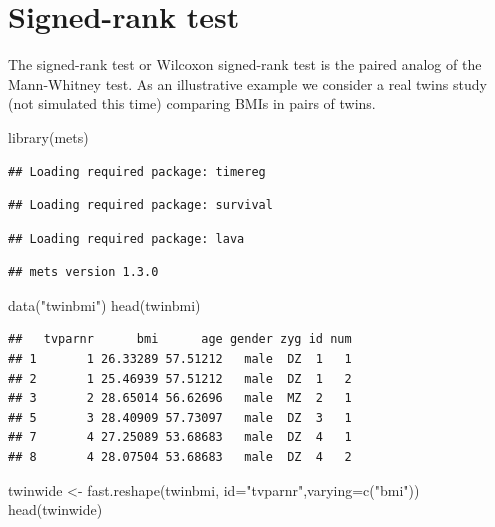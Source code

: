 \documentclass[
]{book}
\newenvironment{Shaded}{\begin{snugshade}}{\end{snugshade}}
\newcommand{\AttributeTok}[1]{\textcolor[rgb]{0.77,0.63,0.00}{#1}}
\newcommand{\FunctionTok}[1]{\textcolor[rgb]{0.00,0.00,0.00}{#1}}
\newcommand{\NormalTok}[1]{#1}
\newcommand{\OtherTok}[1]{\textcolor[rgb]{0.56,0.35,0.01}{#1}}
\newcommand{\StringTok}[1]{\textcolor[rgb]{0.31,0.60,0.02}{#1}}
\begin{document}
\hypertarget{signed-rank-test}{%
\section{Signed-rank test}\label{signed-rank-test}}

The signed-rank test or Wilcoxon signed-rank test is the paired analog of the Mann-Whitney test. As an illustrative example we consider a real twins study (not simulated this time) comparing BMIs in pairs of twins.

\begin{Shaded}
\begin{Highlighting}[]
\FunctionTok{library}\NormalTok{(mets)}
\end{Highlighting}
\end{Shaded}

\begin{verbatim}
## Loading required package: timereg
\end{verbatim}

\begin{verbatim}
## Loading required package: survival
\end{verbatim}

\begin{verbatim}
## Loading required package: lava
\end{verbatim}

\begin{verbatim}
## mets version 1.3.0
\end{verbatim}

\begin{Shaded}
\begin{Highlighting}[]
\FunctionTok{data}\NormalTok{(}\StringTok{"twinbmi"}\NormalTok{)}
\FunctionTok{head}\NormalTok{(twinbmi)}
\end{Highlighting}
\end{Shaded}

\begin{verbatim}
##   tvparnr      bmi      age gender zyg id num
## 1       1 26.33289 57.51212   male  DZ  1   1
## 2       1 25.46939 57.51212   male  DZ  1   2
## 3       2 28.65014 56.62696   male  MZ  2   1
## 5       3 28.40909 57.73097   male  DZ  3   1
## 7       4 27.25089 53.68683   male  DZ  4   1
## 8       4 28.07504 53.68683   male  DZ  4   2
\end{verbatim}

\begin{Shaded}
\begin{Highlighting}[]
\NormalTok{twinwide }\OtherTok{\textless{}{-}} \FunctionTok{fast.reshape}\NormalTok{(twinbmi, }\AttributeTok{id=}\StringTok{"tvparnr"}\NormalTok{,}\AttributeTok{varying=}\FunctionTok{c}\NormalTok{(}\StringTok{"bmi"}\NormalTok{))}
\FunctionTok{head}\NormalTok{(twinwide)}
\end{Highlighting}
\end{Shaded}
\end{document}
